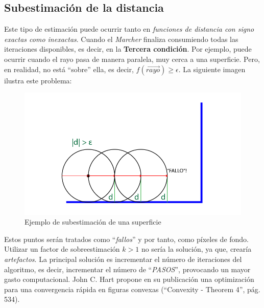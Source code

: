 \subsection{Subestimación de la distancia}
Este tipo de estimación puede ocurrir tanto en \textit{funciones de distancia con signo exactas como inexactas}. Cuando el \textit{Marcher} finaliza consumiendo todas las iteraciones disponibles, es decir, en la \textbf{Tercera condición}. Por ejemplo, puede ocurrir cuando el rayo pasa de manera paralela, muy cerca a una superficie. Pero, en realidad, no está \enquote{sobre} ella, es decir, \(f(\Vec{rayo}) \ge \epsilon\). La siguiente imagen ilustra este problema:

\begin{figure}[H]
  \centering
  \captionsetup{justification=centering}%
  \includegraphics[width=1.0\textwidth]{secciones/imagenes/estimation/subestimacion.png}
  \caption{Ejemplo de subestimación de una superficie}
  \label{fig:subestimacion}
\end{figure}

Estos puntos serán tratados como \enquote{\textit{fallos}} y por tanto, como píxeles de fondo. Utilizar un factor de sobreestimación \(k > 1\) no sería la solución, ya que, crearía \textit{artefactos}. La principal solución es incrementar el número de iteraciones del algoritmo, es decir, incrementar el número de \enquote{\textit{PASOS}}, provocando un mayor gasto computacional. John C. Hart propone en su publicación una optimización para una convergencia rápida en figuras convexas \cite{hart1996sphere} (\enquote{Convexity - Theorem 4}, pág. 534). 